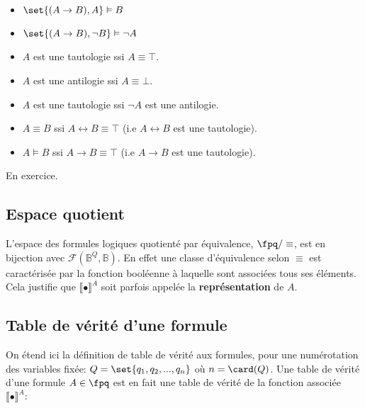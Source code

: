\documentclass{scrartcl}
\begin{document}

			\begin{itemize}
				\item $\set{(A\rightarrow B), A} \vDash B$
				\item $\set{(A \rightarrow B), \neg B} \vDash \neg A$
			\end{itemize}

			\begin{itemize}
				\item $A$ est une tautologie ssi $A \equiv \top$.
				\item $A$ est une antilogie ssi $A \equiv \bot$.
				\item $A$ est une tautologie ssi $\neg A$ est une antilogie.
			\end{itemize}

			\begin{itemize}
				\item $A \equiv B$ ssi $A \leftrightarrow B \equiv \top$ (i.e $A \leftrightarrow B$ est une tautologie).
				\item $A \vDash B$ ssi $A \rightarrow B \equiv \top$ (i.e $A \rightarrow B$ est une tautologie).
			\end{itemize}
			\begin{demo}
				\item En exercice.
			\end{demo}

		\subsection{Espace quotient}
			L'espace des formules logiques quotienté par équivalence, $\fpq/\equiv$, est en bijection avec $\mathcal{F}(\mathbb{B}^Q,\mathbb{B})$.
			En effet une classe d'équivalence selon $\equiv$ est caractérisée par la fonction booléenne à laquelle sont associées tous ses éléments. 
			Cela justifie que $\llbracket\bullet\rrbracket^A$ soit parfois appelée la \textbf{représentation} de $A$.

		\subsection{Table de vérité d'une formule}
			On étend ici la définition de table de vérité aux formules, pour une numérotation des variables fixée: $Q = \set{q_1,q_2,...,q_n}$ où $n = \card(Q)$.
			Une table de vérité d'une formule $A \in \fpq$ est en fait une table de vérité de la fonction associée $\llbracket\bullet\rrbracket^A :$
\end{document}
